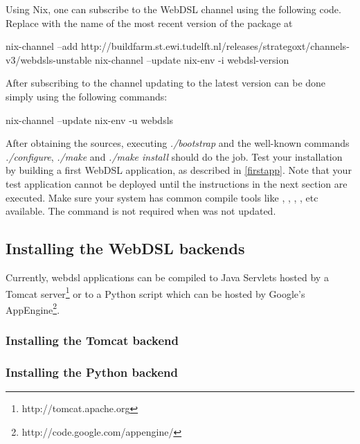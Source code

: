 \label{updatewebdsl}
Using Nix, one can subscribe to the WebDSL channel using the following code. Replace  with the name of the most recent version of the  package at 
\begin{shell}
nix-channel --add http://buildfarm.st.ewi.tudelft.nl/releases/strategoxt/channels-v3/webdsls-unstable
nix-channel --update
nix-env -i webdsl-version
\end{shell}
After subscribing to the channel updating to the latest version can be done simply using the following commands:
\begin{shell}
nix-channel --update
nix-env -u webdsls
\end{shell}
After obtaining the sources, executing \emph{./bootstrap} and the well-known commands \emph{./configure}, \emph{./make} and \emph{./make install} should do the job. Test your installation by building a first WebDSL application, as described in \ref{firstapp}. Note that your test application cannot be deployed until the instructions in the next section are executed. Make sure your system has common compile tools like , , , ,  etc available. The  command is not required when  was not updated. 

\subsection{Installing the WebDSL backends}\label{installbackend}
Currently, webdsl applications can be compiled to Java Servlets hosted by a Tomcat server\footnote{http://tomcat.apache.org} or to a Python script which can be hosted by Google's AppEngine\footnote{http://code.google.com/appengine/}. 

\subsubsection{Installing the Tomcat backend}

\subsubsection{Installing the Python backend}
